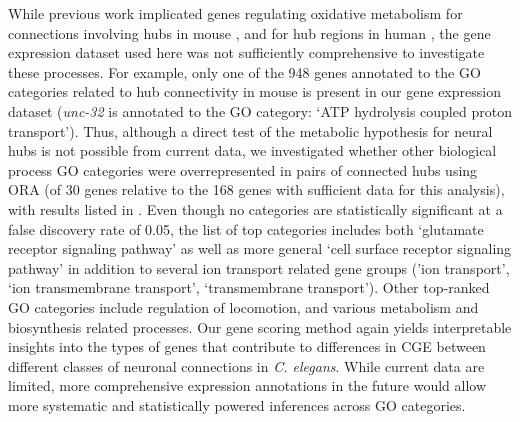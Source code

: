 \documentclass[10pt,letterpaper]{article}
\begin{document}
{While previous work implicated genes regulating oxidative metabolism for connections involving hubs in mouse \cite{Fulcher:2016ck}, and for hub regions in human \cite{Vertes2016a}, the gene expression dataset used here was not sufficiently comprehensive to investigate these processes.
For example, only one of the 948 genes annotated to the GO categories related to hub connectivity in mouse is present in our gene expression dataset (\emph{unc-32} is annotated to the GO category: `ATP hydrolysis coupled proton transport').
Thus, although a direct test of the metabolic hypothesis for neural hubs is not possible from current data, we investigated whether other biological process GO categories were overrepresented in pairs of connected hubs using ORA (of 30 genes relative to the 168 genes with sufficient data for this analysis), with results listed in .
Even though no categories are statistically significant at a false discovery rate of 0.05, the list of top categories includes both `glutamate receptor signaling pathway' as well as more general `cell surface receptor signaling pathway' in addition to several ion transport related gene groups ('ion transport', `ion transmembrane transport', `transmembrane transport').
Other top-ranked GO categories include regulation of locomotion, and various metabolism and biosynthesis related processes.
Our gene scoring method again yields interpretable insights into the types of genes that contribute to differences in CGE between different classes of neuronal connections in \emph{C. elegans}.
While current data are limited, more comprehensive expression annotations in the future would allow more systematic and statistically powered inferences across GO categories.

}
\end{document}
